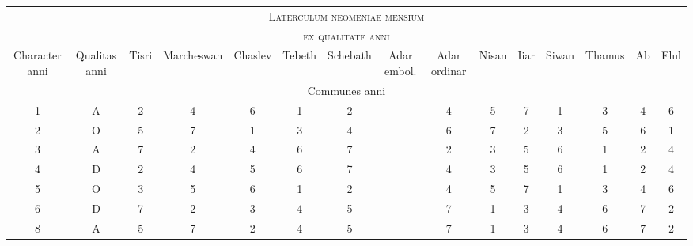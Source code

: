 %
{
\normalsize
\centering
\setlength{\tabcolsep}{2.0pt}
\newcommand{\hts}{\tiny}
\newcommand{\cwd}{3em}
%
\newcommand{\da}{\scriptsize{†}}
\begin{tabular}{@{} c c *{13}{c} @{}}
\toprule
\multicolumn{15}{c}{\Large\textsc{Laterculum neomeniae mensium}} \\
\multicolumn{15}{c}{\large\textsc{ex qualitate anni}} \\
\toprule
  \hts{\parbox[b]{\cwd}{\raggedright Cha\-rac\-ter an\-ni}} &
  \hts{\parbox[b]{\cwd}{\raggedright Qua\-li\-tas an\-ni}} &
  \hts{\parbox[b]{\cwd}{\raggedright Tisri}} &
  \hts{\parbox[b]{\cwd}{\raggedright Mar\-ches\-wan}} &
  \hts{\parbox[b]{\cwd}{\raggedright Chas\-lev}} &
  \hts{\parbox[b]{\cwd}{\raggedright Te\-beth}} &
  \hts{\parbox[b]{\cwd}{\raggedright Sche\-bath}} &
  \hts{\parbox[b]{\cwd}{\raggedright Adar embol.}} &
  \hts{\parbox[b]{\cwd}{\raggedright Adar ordinar}} &
  \hts{\parbox[b]{\cwd}{\raggedright Nisan}} &
  \hts{\parbox[b]{\cwd}{\raggedright Iiar}} &
  \hts{\parbox[b]{\cwd}{\raggedright Siwan}} &
  \hts{\parbox[b]{\cwd}{\raggedright Tha\-mus}} &
  \hts{\parbox[b]{\cwd}{\raggedright Ab}} &
  \hts{\parbox[b]{\cwd}{\raggedright Elul}}
\\
\midrule
\multicolumn{15}{c}{Communes anni}\\
\midrule
 1 & A & 2 & 4 & 6 & 1 & 2 & ~ & 4 & 5 & 7 & 1 & 3 & 4 & 6 \\
 2 & O & 5 & 7 & 1 & 3 & 4 & ~ & 6 & 7 & 2 & 3 & 5 & 6 & 1 \\
 3 & A & 7 & 2 & 4 & 6 & 7 & ~ & 2 & 3 & 5 & 6 & 1 & 2 & 4 \\
 4 & D & 2 & 4 & 5 & 6 & 7 & ~ & 4 & 3 & 5 & 6 & 1 & 2 & 4 \\
 5 & O & 3 & 5 & 6 & 1 & 2 & ~ & 4 & 5 & 7 & 1 & 3 & 4 & 6 \\
 6 & D & 7 & 2 & 3 & 4 & 5 & ~ & 7 & 1 & 3 & 4 & 6 & 7 & 2 \\
 8 & A & 5 & 7 & 2 & 4 & 5 & ~ & 7 & 1 & 3 & 4 & 6 & 7 & 2 \\
\midrule

\end{tabular}}
